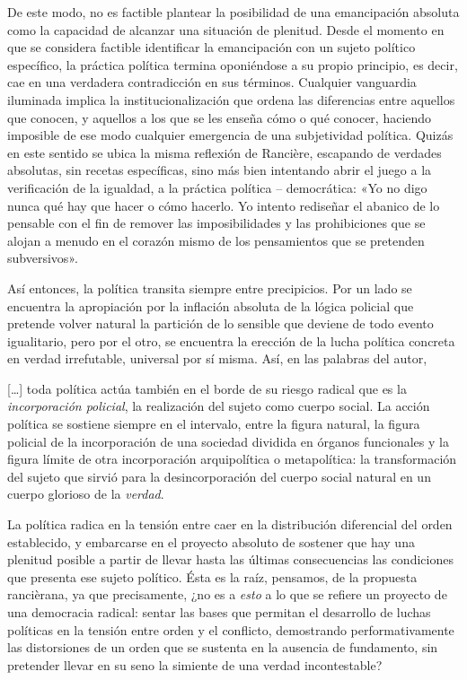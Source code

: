 De este modo, no es factible plantear la posibilidad de una emancipación absoluta como la capacidad de alcanzar una situación de plenitud. Desde el momento en que se considera factible identificar la emancipación con un sujeto político específico, la práctica política termina oponiéndose a su propio principio, es decir, cae en una verdadera contradicción en sus términos. Cualquier vanguardia iluminada implica la institucionalización que ordena las diferencias entre aquellos que conocen, y aquellos a los que se les enseña cómo o qué conocer, haciendo imposible de ese modo cualquier emergencia de una subjetividad política. Quizás en este sentido se ubica la misma reflexión de Rancière, escapando de verdades absolutas, sin recetas específicas, sino más bien intentando abrir el juego a la verificación de la igualdad, a la práctica política -- democrática: «Yo no digo nunca qué hay que hacer o cómo hacerlo. Yo intento rediseñar el abanico de lo pensable con el fin de remover las imposibilidades y las prohibiciones que se alojan a menudo en el corazón mismo de los pensamientos que se pretenden subversivos».

Así entonces, la política transita siempre entre precipicios. Por un lado se encuentra la apropiación por la inflación absoluta de la lógica policial que pretende volver natural la partición de lo sensible que deviene de todo evento igualitario, pero por el otro, se encuentra la erección de la lucha política concreta en verdad irrefutable, universal por sí misma. Así, en las palabras del autor,

{[}\ldots{]} toda política actúa también en el borde de su riesgo radical que es la \emph{incorporación policial}, la realización del sujeto como cuerpo social. La acción política se sostiene siempre en el intervalo, entre la figura natural, la figura policial de la incorporación de una sociedad dividida en órganos funcionales y la figura límite de otra incorporación arquipolítica o metapolítica: la transformación del sujeto que sirvió para la desincorporación del cuerpo social natural en un cuerpo glorioso de la \emph{verdad}.

La política radica en la tensión entre caer en la distribución diferencial del orden establecido, y embarcarse en el proyecto absoluto de sostener que hay una plenitud posible a partir de llevar hasta las últimas consecuencias las condiciones que presenta ese sujeto político. Ésta es la raíz, pensamos, de la propuesta rancièrana, ya que precisamente, ¿no es a \emph{esto} a lo que se refiere un proyecto de una democracia radical: sentar las bases que permitan el desarrollo de luchas políticas en la tensión entre orden y el conflicto, demostrando performativamente las distorsiones de un orden que se sustenta en la ausencia de fundamento, sin pretender llevar en su seno la simiente de una verdad incontestable?

